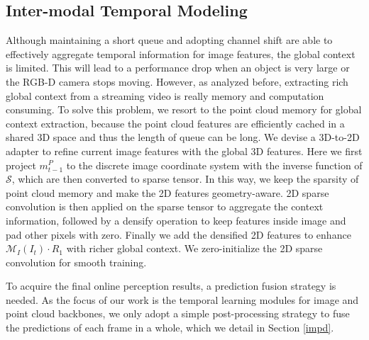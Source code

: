 \subsection{Inter-modal Temporal Modeling}
Although maintaining a short queue and adopting channel shift are able to effectively aggregate temporal information for image features, the global context is limited. This will lead to a performance drop when an object is very large or the RGB-D camera stops moving.
However, as analyzed before, extracting rich global context from a streaming video is really memory and computation consuming.
To solve this problem, we resort to the point cloud memory for global context extraction, because the point cloud features are efficiently cached in a shared 3D space and thus the length of queue can be long. We devise a 3D-to-2D adapter to refine current image features with the global 3D features.
Here we first project $m^P_{t-1}$ to the discrete image coordinate system with the inverse function of $\mathcal{S}$, which are then converted to sparse tensor. 
In this way, we keep the sparsity of point cloud memory and make the 2D features geometry-aware.
2D sparse convolution is then applied on the sparse tensor to aggregate the context information, followed by a densify operation to keep features inside image and pad other pixels with zero. 
Finally we add the densified 2D features to enhance $\mathcal{M}_{I}(I_t)\cdot R_1$ with richer global context. We zero-initialize the 2D sparse convolution for smooth training.

To acquire the final online perception results, a prediction fusion strategy is needed. As the focus of our work is the temporal learning modules for image and point cloud backbones, we only adopt a simple post-processing strategy to fuse the predictions of each frame in a whole, which we detail in Section \ref{impd}.



